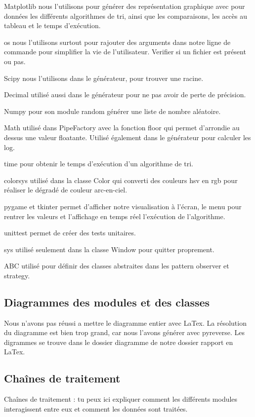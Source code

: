 \documentclass[10pt,a4paper]{article}
\begin{document}
    Matplotlib nous l'utilisons pour générer des représentation graphique avec pour données les différents algorithmes de tri, ainsi que les comparaisons, les accès au tableau et le temps d'exécution.

    os nous l'utilisons surtout pour rajouter des arguments dans notre ligne de commande pour simplifier la vie de l'utilisateur. Verifier si un fichier est présent ou pas.

    Scipy nous l'utilisons dans le générateur, pour trouver une racine.

    Decimal utilisé aussi dans le générateur pour ne pas avoir de perte de précision.

    Numpy pour son module random générer une liste de nombre aléatoire.

    Math utilisé dans PipeFactory avec la fonction floor qui permet d'arrondie au dessus une valeur floatante. Utilisé également dans le générateur pour calculer les log.

    time pour obtenir le temps d'exécution d'un algorithme de tri.

    colorsys utilisé dans la classe Color qui converti des couleurs hsv en rgb pour réaliser le dégradé de couleur arc-en-ciel.

    pygame et tkinter permet d'afficher notre visualisation à l'écran, le menu pour rentrer les valeurs et l'affichage en temps réel l'exécution de l'algorithme.

    unittest permet de créer des tests unitaires.

    sys utilisé seulement dans la classe Window pour quitter proprement.

    ABC utilisé pour définir des classes abstraites dans les pattern observer et strategy.
    
    \subsection{Diagrammes des modules et des classes}
    Nous n'avons pas réussi a mettre le diagramme entier avec LaTex.
    La résolution du diagramme est bien trop grand, car nous l'avons générer avec pyreverse.
    Les digrammes se trouve dans le dossier diagramme de notre dossier rapport en LaTex.
    
    
    \subsection{Chaînes de traitement}
    Chaînes de traitement : tu peux ici expliquer comment les différents modules interagissent entre eux et comment les données sont traitées.
    
\end{document}
